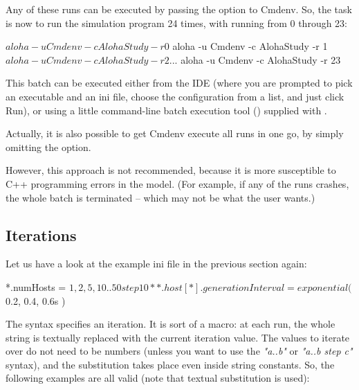 Any of these runs can be executed by passing the 
option to Cmdenv. So, the task is now to run the simulation program 24
times, with  running from 0 through 23:

\begin{commandline}
$ aloha -u Cmdenv -c AlohaStudy -r 0
$ aloha -u Cmdenv -c AlohaStudy -r 1
$ aloha -u Cmdenv -c AlohaStudy -r 2
...
$ aloha -u Cmdenv -c AlohaStudy -r 23
\end{commandline}

This batch can be executed either from the {\opp} IDE (where you are
prompted to pick an executable and an ini file, choose the configuration
from a list, and just click Run), or using a little command-line
batch execution tool () supplied with {\opp}.

Actually, it is also possible to get Cmdenv execute all runs in one go,
by simply omitting the  option.



However, this approach is not recommended, because it is more
susceptible to C++ programming errors in the model. (For example, if
any of the runs crashes, the whole batch is terminated -- which may
not be what the user wants.)


\subsection{Iterations}
\label{sec:config-sim:iterations}

Let us have a look at the example ini file in the previous section again:

\begin{inifile}
*.numHosts = ${1, 2, 5, 10..50 step 10}
**.host[*].generationInterval = exponential( ${0.2, 0.4, 0.6}s )
\end{inifile}

The  syntax specifies an iteration. It is sort of a macro: at
each run, the whole  string is textually replaced with the
current iteration value. The values to iterate over do not need to be
numbers (unless you want to use the \textit{"a..b"} or
\textit{"a..b step c"} syntax), and the
substitution takes place even inside string constants. So, the
following examples are all valid (note that textual substitution is
used):

